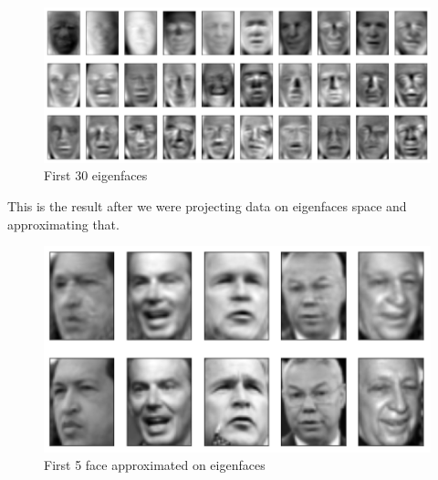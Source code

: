 \documentclass[a4paper, 12pt]{report}
\begin{document}
\begin{figure}[H]
    \center
    \includegraphics[scale = 0.6]{eigenfaces.png}
    \caption{First 30 eigenfaces}
\end{figure}

This is the result after we were projecting data on eigenfaces space and approximating that.

\begin{figure}[H]
    \center
    \includegraphics[scale=0.8]{face_appr.png}
    \caption{First 5 face approximated on eigenfaces}
\end{figure}
\end{document}
